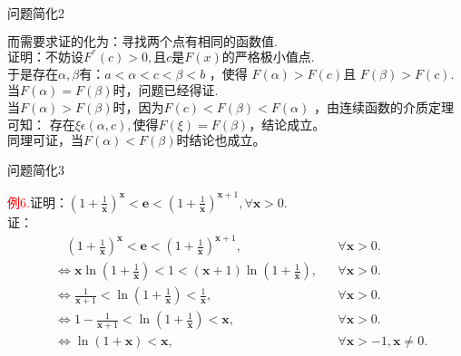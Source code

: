 \documentclass{beamer}
\begin{document}
\begin{frame}{问题简化2}
	\begin{spacing}{1.5}
		$\text{而需要求证的化为：寻找两个点有相同的函数值}.
		$
		$
		\text{证明：不妨设}F^{''}\left( c \right) >0,\text{且}c\text{是}F\left( x \right) \text{的严格极小值点}.
		$
		$
		\text{于是存在}\alpha ,\beta \text{有：}a<\alpha <c<\beta <b
		$
		，使得
		$F\left( \alpha \right) >F\left( c \right)
		$且
		$F\left( \beta \right) >F\left( c \right).
		$\\
		$
		\text{当}F\left( \alpha \right) =F\left( \beta \right) \text{时，问题已经得证}.
		$
		$
		\text{当}F\left( \alpha \right) >F\left( \beta \right) \text{时，因为}F\left( c \right) <F\left( \beta \right) <F\left( \alpha \right)
		$
		，由连续函数的介质定理可知：
		$
		\text{存在}\xi \epsilon \left( \alpha ,c \right) ,\text{使得}F\left( \xi \right) =F\left( \beta \right) \text{，结论成立。}
		$
		$
		\text{同理可证，当}F\left( \alpha \right) <F\left( \beta \right) \text{时结论也成立。}
		$
	\end{spacing}
\end{frame}

\begin{frame}{问题简化3}
	\begin{spacing}{1.0}
		\textcolor{red}{例6.}$
		\text{证明：}\left( 1+\frac{1}{\boldsymbol{x}} \right) ^{\boldsymbol{x}}<\boldsymbol{e}<\left( 1+\frac{1}{\boldsymbol{x}} \right) ^{\boldsymbol{x}+1},\forall \boldsymbol{x}>0.
		$\\
		证：
	\begin{equation*}
		\begin{aligned}
		&\ \ \ \ \left( 1+\frac{1}{\boldsymbol{x}} \right) ^{\boldsymbol{x}}<\boldsymbol{e}<\left( 1+\frac{1}{\boldsymbol{x}} \right) ^{\boldsymbol{x}+1},&&\forall \boldsymbol{x}>0.\\
		&\Leftrightarrow \boldsymbol{x}\ln \left( 1+\frac{1}{\boldsymbol{x}} \right) <1<\left( \boldsymbol{x}+1 \right) \ln \left( 1+\frac{1}{\boldsymbol{x}} \right),&& \forall \boldsymbol{x}>0.\\
		&\Leftrightarrow \frac{1}{\boldsymbol{x}+1}<\ln \left( 1+\frac{1}{\boldsymbol{x}} \right) <\frac{1}{\boldsymbol{x}},&&\forall \boldsymbol{x}>0.\\
		&\Leftrightarrow 1-\frac{1}{\boldsymbol{x}+1}<\ln \left( 1+\frac{1}{\boldsymbol{x}} \right) <\boldsymbol{x}, &&\forall \boldsymbol{x}>0.\\
		&\Leftrightarrow \ln \left( 1+\boldsymbol{x} \right) <\boldsymbol{x}, &&\forall \boldsymbol{x}>-1,\boldsymbol{x}\ne 0.
		\end{aligned}
	\end{equation*}
	\end{spacing}
\end{frame}
\end{document}
